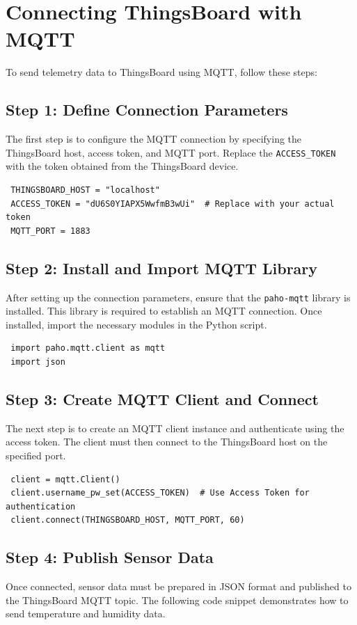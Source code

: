 \documentclass[a4paper,12pt]{report}
\begin{document}
 
 \section{Connecting ThingsBoard with MQTT}
 
 To send telemetry data to ThingsBoard using MQTT, follow these steps:
 
 \subsection{Step 1: Define Connection Parameters}
 The first step is to configure the MQTT connection by specifying the ThingsBoard host, access token, and MQTT port. Replace the \texttt{ACCESS\_TOKEN} with the token obtained from the ThingsBoard device.
 
 \begin{lstlisting}
 THINGSBOARD_HOST = "localhost"
 ACCESS_TOKEN = "dU6S0YIAPX5WwfmB3wUi"  # Replace with your actual token
 MQTT_PORT = 1883
 \end{lstlisting}
 
 \subsection{Step 2: Install and Import MQTT Library}
 After setting up the connection parameters, ensure that the \texttt{paho-mqtt} library is installed. This library is required to establish an MQTT connection. Once installed, import the necessary modules in the Python script.
 
 \begin{lstlisting}
 import paho.mqtt.client as mqtt
 import json
 \end{lstlisting}
 
 \subsection{Step 3: Create MQTT Client and Connect}
 The next step is to create an MQTT client instance and authenticate using the access token. The client must then connect to the ThingsBoard host on the specified port.
 
 \begin{lstlisting}
 client = mqtt.Client()
 client.username_pw_set(ACCESS_TOKEN)  # Use Access Token for authentication
 client.connect(THINGSBOARD_HOST, MQTT_PORT, 60)
 \end{lstlisting}
 
 \subsection{Step 4: Publish Sensor Data}
 Once connected, sensor data must be prepared in JSON format and published to the ThingsBoard MQTT topic. The following code snippet demonstrates how to send temperature and humidity data.
 
\end{document}
